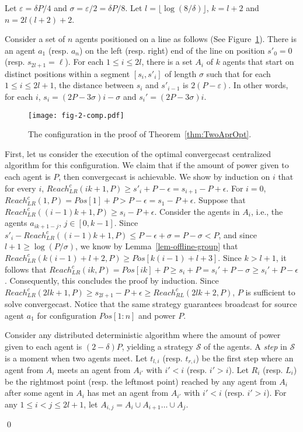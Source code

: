 \documentclass{article}
\newenvironment{proofof}[1]{\medskip\noindent {\bf Proof of #1 : }} { \qed \medskip }
\newcommand{\cA}{\ensuremath{\mathcal{S}\xspace}}
\newcommand\rclr{Reach_{LR}^c\xspace}
\newcommand\rcrl{Reach_{RL}^c\xspace}
\newcommand\convergecast{convergecast\xspace}
\newcommand\cS{\ensuremath{\mathcal{S}\xspace}}
\begin{document}
\begin{proofof}{Theorem \ref{thm:TwoAprOpt}}
Let $\varepsilon = \delta P/4$ and $\sigma = \varepsilon /2= \delta
P/8$. Let $l = \lfloor \log(8/\delta)\rfloor$, $k = l+2$ and $n=2l(l+2)+2$.


Consider a set of $n$ agents positioned on a line as follows (See
Figure~\ref{fig-2-comp}).  There is an agent $a_1$
(resp. $a_{n}$) on the left (resp. right) end of the line on
position $s'_0=0$ (resp. $s_{2l+1}=\ell$). For each $1 \leq i \leq 2l$,
there is a set $A_i$ of $k$ agents that start on distinct positions
within a segment $[s_i,s'_i]$ of length $\sigma$ such that for each $1
\leq i \leq 2l+1$, the distance between $s_i$ and $s'_{i-1}$ is
$2(P-\varepsilon)$. In other words, for each $i$, $s_i=
(2P-3\sigma)i-\sigma$ and $s_i'=(2P-3\sigma)i$.

\begin{figure}
\centering
\texttt{[image: fig-2-comp.pdf]}\caption{The configuration in the proof of Theorem~\ref{thm:TwoAprOpt}.}
\label{fig-2-comp}
\end{figure}

First, let us consider the execution of the optimal convergecast centralized algorithm for this
configuration. We claim that if the amount of power given to each
agent is $P$, then {\convergecast} is achievable. We show by induction on
$i$ that for every $i$, $\rclr(ik+1,P) \geq s'_i + P-\epsilon = s_{i+1}
- P +\epsilon$. For $i = 0$, $\rclr(1,P) = Pos[1]+P > P-\epsilon =
s_1-P+\epsilon$. Suppose that $\rclr((i-1)k+1,P) \geq s_{i} - P
+\epsilon$. Consider the agents in $A_i$, i.e., the agents $a_{ik+1-j}$,
$j \in [0,k-1]$. Since $s'_i - \rclr((i-1)k+1,P) \leq
P-\epsilon+\sigma = P-\sigma < P$, and since $l+1 \geq \log(P/\sigma)$,
we know by Lemma~\ref{lem-offline-group} that
$\rclr(k(i-1)+l+2,P)\geq Pos[k(i-1)+l+3]$. Since $k > l+1$, it
follows that $\rclr(ik,P) = Pos[ik]+P \geq s_i + P =
s_i'+P-\sigma \geq s_i'+P-\epsilon$. Consequently, this concludes the proof by induction. Since $\rclr(2lk+1,P) \geq s_{2l+1} - P
+\epsilon \geq \rcrl(2lk+2,P)$, $P$ is sufficient to solve
{\convergecast}. Notice that the same strategy guarantees broadcast for source agent $a_1$ for configuration 
$Pos[1:n]$ and power $P$.

\medskip


Consider any distributed deterministic algorithm where the amount of power
given to each agent is $(2-\delta)P$, yielding a strategy $\cS$ of the agents. 
 A \emph{step} in $\cA$ is a moment when two
agents meet.  Let $t_{l,i}$ (resp. $t_{r,i}$) be the first step where an
agent from $A_i$ meets an agent from $A_{i'}$ with $i' < i$ (resp. $i'
> i$).  Let $R_i$ (resp. $L_i$) be the rightmost point
(resp. the leftmost point) reached by any agent from $A_i$ after some agent in
$A_i$ has met an agent from $A_{i'}$ with $i' < i$ (resp. $i' >
i$). For any $1\leq i < j \leq 2l+1$, let $A_{i,j}= A_i \cup A_{i+1}
\ldots  \cup A_{j}$.



\end{proofof}
\end{document}

